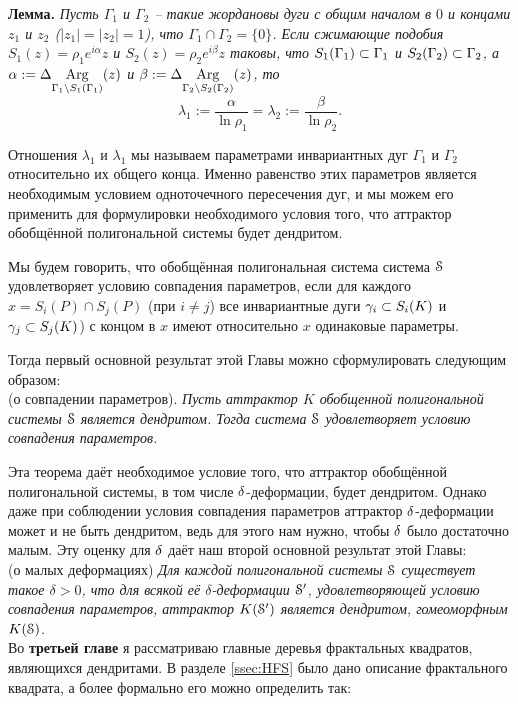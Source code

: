 {\bf Лемма.}
{\em Пусть $\Gamma_1$ и $\Gamma_2$ -- такие жордановы дуги с общим началом в $0$ и  концами $z_1$ и $z_2$ ($|z_1|=|z_2|=1$), что $\Gamma_1\cap\Gamma_2=\{0\}$.
Если сжимающие подобия $S_1(z)=\rho_1 e^{i\alpha}z$ и $S_2(z)=\rho_2 e^{i\beta}z$ таковы, что $S_1(\Gamma_1)\subset\Gamma_1$ и $S_2(\Gamma_2)\subset\Gamma_2$, 
а $\alpha:=\Delta\underset{{\Gamma_1\setminus S_1(\Gamma_1)}}{\mathrm {Arg}}(z)$ и $\beta:=\Delta\underset{{\Gamma_2\setminus S_2(\Gamma_2)}}{\mathrm {Arg}}(z)$, то
$$\lambda_1:=\dfrac{\alpha}{\ln\rho_1} = \lambda_2:=\dfrac{\beta}{\ln\rho_2}.$$}

Отношения $\lambda_1$ и $\lambda_1$ мы называем параметрами инвариантных дуг $\Gamma_1$ и $\Gamma_2$ относительно их общего конца.
Именно равенство этих параметров является необходимым условием одноточечного пересечения дуг, и мы можем его применить для формулировки необходимого условия того, что аттрактор обобщённой полигональной системы будет дендритом.

Мы будем говорить, что обобщённая полигональная система система ${\EuScript S}$ удовлетворяет условию совпадения параметров, если для каждого $x=S_i(P)\cap S_j(P)$ (при $i\neq j$) все инвариантные дуги $\gamma_i\subset S_i(K)$ и $\gamma_j\subset S_j(K)$) с концом в $x$ имеют относительно $x$ одинаковые параметры.

Тогда первый основной результат этой Главы можно сформулировать следующим образом:\\

 (о совпадении параметров). 
{\em
Пусть аттрактор $K$ обобщенной полигональной системы ${\EuScript S}$ является дендритом. 
Тогда система ${\EuScript S}$ удовлетворяет условию совпадения параметров.}

Эта теорема даёт необходимое условие того, что аттрактор обобщённой полигональной системы, в том числе $\delta$-деформации, будет дендритом. 
Однако даже при соблюдении условия совпадения параметров аттрактор $\delta$-деформации может и не быть дендритом, ведь для этого нам нужно, чтобы $\delta$ было достаточно малым. 
Эту оценку для $\delta$ даёт наш второй основной результат этой Главы:\\

 (о малых деформациях)
{\em Для каждой полигональной системы ${\EuScript S}$ существует такое $\delta > 0$, что для всякой её $\delta$-деформации ${\EuScript S}'$, удовлетворяющей условию совпадения параметров, аттрактор $K({\EuScript S}')$ является дендритом, гомеоморфным $K({\EuScript S})$.}\\


Во {\bf третьей главе} я рассматриваю главные деревья фрактальных квадратов, являющихся дендритами.
В разделе \ref{ssec:HFS} было дано описание фрактального квадрата, а более формально его можно определить так:\\

